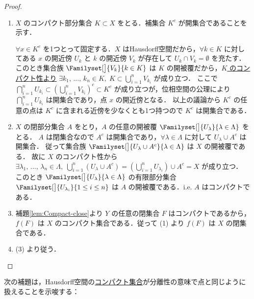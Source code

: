 \documentclass[algtopo_main]{subfiles}
\begin{document}
\begin{proof}
    \begin{enumerate}
        \item $X$ のコンパクト部分集合 $K \subset X$ をとる．補集合 $K^c$ が開集合であることを示す．
        
        $\forall x \in K^c$ を1つとって固定する．$X$ はHausdorff空間だから，$\forall k \in K$ に対してある $x$ の開近傍 $U_k$ と $k$ の開近傍 $V_k$ が存在して $U_k \cap V_k = \emptyset$ を充たす．
        このとき集合族 $\Familyset[\big]{V_k}{k \in K}$ は $K$ の開被覆だから，\underline{$K$ のコンパクト性より} $\exists k_1,\, \dots,\, k_n \in K,\; K \subset \bigcup_{i = 1}^n V_{k_i}$ が成り立つ．
        ここで $\bigcap_{i=1}^n U_{k_i} \subset \left( \bigcup_{i = 1}^n V_{k_i} \right)^c \subset K^c$ が成り立つが，位相空間の公理により $\bigcap_{i=1}^n U_{k_i}$ は開集合であり，点 $x$ の開近傍となる．
        以上の議論から $K^c$ の任意の点は $K^c$ に含まれる近傍を少なくとも1つ持つので $K^c$ は開集合である．

        \item $X$ の閉部分集合 $A$ をとり，$A$ の任意の開被覆 $\Familyset[\big]{U_\lambda}{\lambda \in \Lambda}$ をとる．
        $A$ は閉集合なので $A^c$ は開集合であり，$\forall \lambda \in \Lambda$ に対して $U_\lambda \cup A^c$ は開集合．
        従って集合族 $\Familyset[\big]{U_\lambda \cup A^c}{\lambda \in \Lambda}$ は $X$ の開被覆である．
        故に $X$ のコンパクト性から $\exists \lambda_1,\, \dots ,\, \lambda_n \in \Lambda,\; \bigcup_{i=1}^n (U_\lambda \cup A^c) = \left(\bigcup_{i=1}^n U_{\lambda_i}\right) \cup A^c = X$ が成り立つ．
        このとき $\Familyset[\big]{U_\lambda}{\lambda \in \Lambda}$ の有限部分集合 $\Familyset[\big]{U_{\lambda_i}}{1 \le i \le n}$ は $A$ の開被覆である．i.e. $A$ はコンパクトである．

        \item 補題\ref{lem:Compact-close}より $Y$ の任意の閉集合 $F$ はコンパクトであるから， $f(F)$ は $X$ のコンパクト集合である．従って (1) より $f(F)$ は $X$ の閉集合である．
        \item (3) より従う．
    \end{enumerate}
\end{proof}

次の補題は，Hausdorff空間の\hyperref[def:compact]{コンパクト集合}が分離性の意味で点と同じように扱えることを示唆する：
\end{document}
